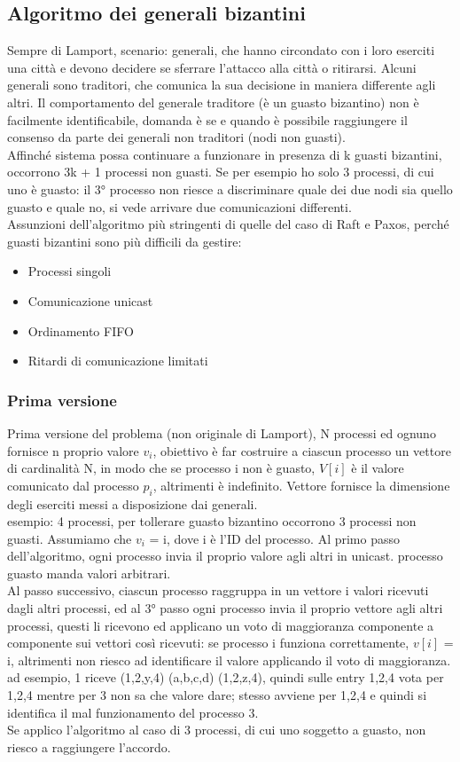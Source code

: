 \documentclass{article}
\begin{document}
\subsection{Algoritmo dei generali bizantini}
Sempre di Lamport, scenario: generali, che hanno circondato con i loro eserciti una città e devono decidere se sferrare l'attacco alla città o ritirarsi. Alcuni generali sono traditori, che comunica la sua decisione in maniera differente agli altri. Il comportamento del generale traditore (è un guasto bizantino) non è facilmente identificabile, domanda è se e quando è possibile raggiungere il consenso da parte dei generali non traditori (nodi non guasti).\\ Affinché sistema possa continuare a funzionare in presenza di k guasti bizantini, occorrono 3k + 1 processi non guasti. Se per esempio ho solo 3 processi, di cui uno è guasto: il 3° processo non riesce a discriminare quale dei due nodi sia quello guasto e quale no, si vede arrivare due comunicazioni differenti.\\ Assunzioni dell'algoritmo più stringenti di quelle del caso di Raft e Paxos, perché guasti bizantini sono più difficili da gestire:
\begin{itemize}
\item Processi singoli
\item Comunicazione unicast
\item Ordinamento FIFO
\item Ritardi di comunicazione limitati
\end{itemize}
\subsubsection{Prima versione}
Prima versione del problema (non originale di Lamport), N processi ed ognuno fornisce n proprio valore $v_i$, obiettivo è far costruire a ciascun processo un vettore di cardinalità N, in modo che se processo i non è guasto, $V[i]$ è il valore comunicato dal processo $p_i$, altrimenti è indefinito. Vettore fornisce la dimensione degli eserciti messi a disposizione dai generali.\\ esempio: 4 processi, per tollerare guasto bizantino occorrono 3 processi non guasti. Assumiamo che $v_i$ = i, dove i è l'ID del processo. Al primo passo dell'algoritmo, ogni processo invia il proprio valore agli altri in unicast. processo guasto manda valori arbitrari.\\ Al passo successivo, ciascun processo raggruppa in un vettore i valori ricevuti dagli altri processi, ed al 3° passo ogni processo invia il proprio vettore agli altri processi, questi li ricevono ed applicano un voto di maggioranza componente a componente sui vettori così ricevuti: se processo i funziona correttamente, $v[i]$ = i, altrimenti non riesco ad identificare il valore applicando il voto di maggioranza. ad esempio, 1 riceve (1,2,y,4) (a,b,c,d) (1,2,z,4), quindi sulle entry 1,2,4 vota per 1,2,4 mentre per 3 non sa che valore dare; stesso avviene per 1,2,4 e quindi si identifica il mal funzionamento del processo 3.\\ Se applico l'algoritmo al caso di 3 processi, di cui uno soggetto a guasto, non riesco a raggiungere l'accordo.
\end{document}
